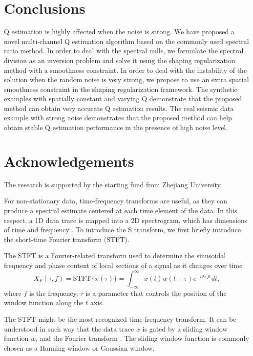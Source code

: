\section{Conclusions}
Q estimation is highly affected when the noise is strong. We have proposed a novel multi-channel Q estimation algorithm based on the commonly used spectral ratio method. In order to deal with the spectral nulls, we formulate the spectral division as an inversion problem and solve it using the shaping regularization method with a smoothness constraint. In order to deal with the instability of the solution when the random noise is very strong, we propose to use an extra spatial smoothness constraint in the shaping regularization framework. The synthetic examples with spatially constant and varying Q demonstrate that the proposed method can obtain very accurate Q estimation results. The real seismic data example with strong noise demonstrates that the proposed method can help obtain stable Q estimation performance in the presence of high noise level.


\section{Acknowledgements}
The research is supported by the starting fund from Zhejiang University.




\newpage
{}
For non-stationary data, time-frequency transforms are useful, as they can produce a spectral estimate centered at each time element of the data. In this respect, a 1D data trace is mapped into a 2D spectrogram, which has dimensions of time and frequency \cite[]{reine2009}. To introduce the S transform, we first briefly introduce the short-time Fourier transform (STFT).

The STFT is a Fourier-related transform used to determine the sinusoidal frequency and phase content of local sections of a signal as it changes over time
\begin{equation}
\label{eq:constft}
X_F(\tau,f)=\text{STFT}\{x(\tau)\}=\int_{-\infty}^{\infty}x(t)w(t-\tau)e^{-i2\pi ft}dt,
\end{equation}
where $f$ is the frequency, $\tau$ is a parameter that controls the position of the window function along the $t$ axis. 

The STFT might be the most recognized time-frequency transform. It can be understood in such way that the data trace $x$ is gated by a sliding window function $w$, and the Fourier transform \cite[]{bracewell1978}. The sliding window function is commonly chosen as a Hanning window or Gaussian window.

